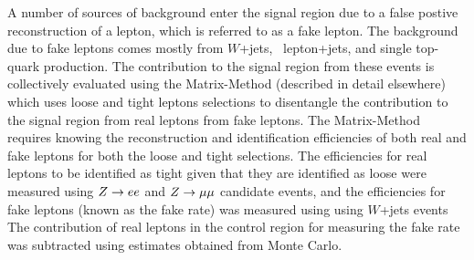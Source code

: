 
A number of sources of background enter the signal region due to a false postive reconstruction
of a lepton, which is referred to as a fake lepton.
The background due to fake leptons comes mostly from $W$+jets, \ttbar\, lepton+jets,
and single top-quark production.
The contribution to the signal region from these events is collectively evaluated
using the Matrix-Method (described in detail elsewhere) which uses loose and tight
leptons selections to disentangle the contribution to the signal region from 
real leptons from fake leptons.
The Matrix-Method requires knowing the reconstruction and identification efficiencies of both
real and fake leptons for both the loose and tight selections.
The efficiencies for real leptons to be identified as tight given that they are identified as loose
were measured using $Z \rightarrow ee$ and $Z \rightarrow \mu\mu$ candidate events, and the efficiencies for fake leptons
(known as the fake rate) was measured using using $W$+jets events
The contribution of real leptons in the control region for measuring the fake rate was 
subtracted using estimates obtained from Monte Carlo.


